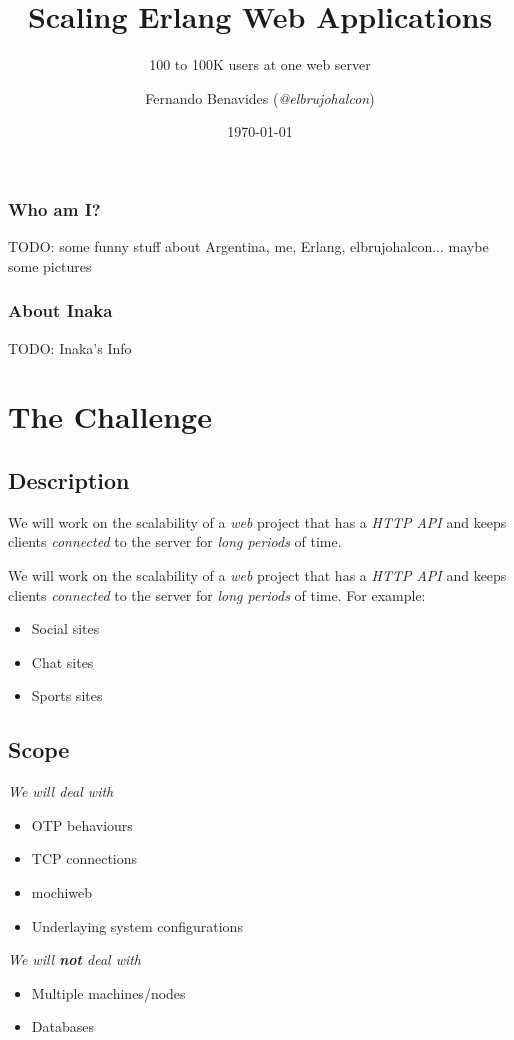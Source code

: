 \documentclass[utf8]{beamer}
\begin{document}
\title{Scaling Erlang Web Applications}
\subtitle{100 to 100K users at one web server}
\author{Fernando Benavides (\textit{@elbrujohalcon})}
\date{\today}

\frame{\titlepage} 

\begin{frame}
	\frametitle{Who am I?}
	TODO: some funny stuff about Argentina, me, Erlang, elbrujohalcon... maybe some pictures
\end{frame}

\begin{frame}
	\frametitle{About Inaka}
	TODO: Inaka's Info
\end{frame}


\section{The Challenge}
\subsection{Description}
\begin{frame}
	We will work on the scalability of a \emph{web} project \pause that has a \emph{HTTP API} \pause and keeps clients \emph{connected} to the server \pause for \emph{long periods} of time.
\end{frame}
\begin{frame}
	We will work on the scalability of a \emph{web} project that has a \emph{HTTP API} and keeps clients \emph{connected} to the server for \emph{long periods} of time.
	For example:
	\begin{itemize}
		\item Social sites
		\item Chat sites
		\item Sports sites
	\end{itemize}
\end{frame}

\subsection{Scope}
\begin{frame}
	\emph{We will deal with}
	\begin{itemize}
		\item OTP behaviours
		\item TCP connections
		\item mochiweb
		\item Underlaying system configurations
	\end{itemize}
	\pause
	\emph{We will \textbf{not} deal with}
	\begin{itemize}
		\item Multiple machines/nodes
		\item Databases
	\end{itemize}
\end{frame}
\end{document}
